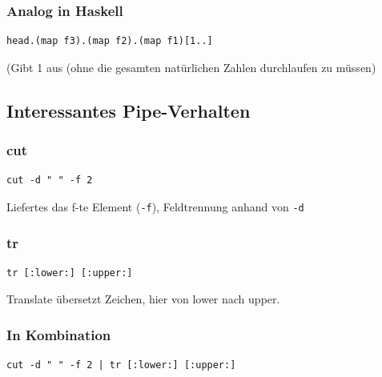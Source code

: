 
		\subsubsection*{Analog in Haskell} %
		\label{ssub:analog_in_haskell}
		
			\lstHaskell
			\begin{lstlisting}
head.(map f3).(map f2).(map f1)[1..]
			\end{lstlisting}
(Gibt 1 aus (ohne die gesamten natürlichen Zahlen durchlaufen zu müssen)

		\subsection*{Interessantes Pipe-Verhalten} %
		\label{sub:interessantes_pipe_verhalten}
			
			\subsubsection*{cut} %
			\label{ssub:cut}

				\lstShell
				\begin{lstlisting}
cut -d " " -f 2
				\end{lstlisting}

				Liefertes das f-te Element (\texttt{-f}), Feldtrennung anhand von \texttt{-d}


			\subsubsection*{tr} %
			\label{ssub:tr}
			
				\lstShell
				\begin{lstlisting}
tr [:lower:] [:upper:]
				\end{lstlisting}

				Translate übersetzt Zeichen, hier von lower nach upper.


			\subsubsection*{In Kombination} %
			\label{ssub:in_kombination}
			
				\lstShell
				\begin{lstlisting}
cut -d " " -f 2 | tr [:lower:] [:upper:]
				\end{lstlisting}

